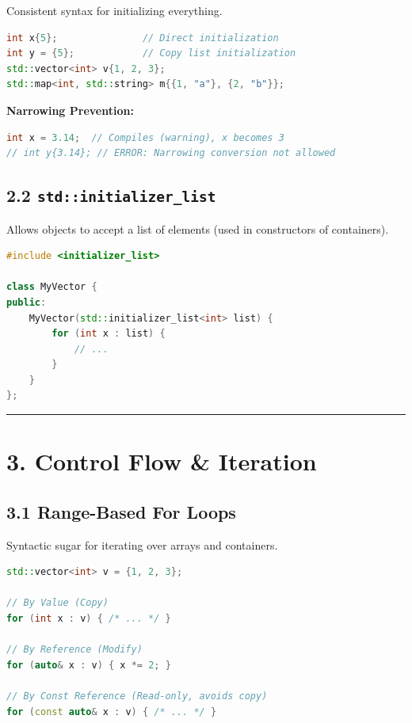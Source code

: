 Consistent syntax for initializing everything.

\begin{lstlisting}[language={C++}]
int x{5};               // Direct initialization
int y = {5};            // Copy list initialization
std::vector<int> v{1, 2, 3};
std::map<int, std::string> m{{1, "a"}, {2, "b"}};
\end{lstlisting}

\textbf{Narrowing Prevention:}

\begin{lstlisting}[language={C++}]
int x = 3.14;  // Compiles (warning), x becomes 3
// int y{3.14}; // ERROR: Narrowing conversion not allowed
\end{lstlisting}

\hypertarget{stdinitializer_list}{%
\subsection{\texorpdfstring{2.2
\texttt{std::initializer\_list}}{2.2 std::initializer\_list}}\label{stdinitializer_list}}

Allows objects to accept a list of elements (used in constructors of
containers).

\begin{lstlisting}[language={C++}]
#include <initializer_list>

class MyVector {
public:
    MyVector(std::initializer_list<int> list) {
        for (int x : list) {
            // ...
        }
    }
};
\end{lstlisting}

\begin{center}\rule{0.5\linewidth}{0.5pt}\end{center}

\hypertarget{control-flow-iteration}{%
\section{3. Control Flow \& Iteration}\label{control-flow-iteration}}

\hypertarget{range-based-for-loops}{%
\subsection{3.1 Range-Based For Loops}\label{range-based-for-loops}}

Syntactic sugar for iterating over arrays and containers.

\begin{lstlisting}[language={C++}]
std::vector<int> v = {1, 2, 3};

// By Value (Copy)
for (int x : v) { /* ... */ }

// By Reference (Modify)
for (auto& x : v) { x *= 2; }

// By Const Reference (Read-only, avoids copy)
for (const auto& x : v) { /* ... */ }
\end{lstlisting}

